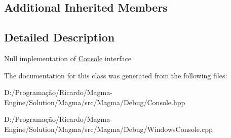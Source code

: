 \subsection*{Additional Inherited Members}


\subsection{Detailed Description}
Null implementation of \hyperlink{class_magma_1_1_console}{Console} interface 



The documentation for this class was generated from the following files\+:\begin{DoxyCompactItemize}
\item 
D\+:/\+Programação/\+Ricardo/\+Magma-\/\+Engine/\+Solution/\+Magma/src/\+Magma/\+Debug/Console.\+hpp\item 
D\+:/\+Programação/\+Ricardo/\+Magma-\/\+Engine/\+Solution/\+Magma/src/\+Magma/\+Debug/Windows\+Console.\+cpp\end{DoxyCompactItemize}
